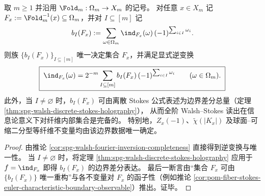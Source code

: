 \begin{corollary}\label{cor:pom-fiber-walsh-stokes-boundary-tomography-reconstruction}
取 \(m\ge 1\) 并沿用 \(\Fold_m:\Omega_m\to X_m\) 的记号。
对任意 \(x\in X_m\) 记 \(F_x:=\Fold_m^{-1}(x)\subseteq\Omega_m\)，并对 \(I\subseteq[m]\) 记
\[
b_I(F_x):=\sum_{\omega\in\Omega_m}\ind_{F_x}(\omega)\,(-1)^{\sum_{i\in I}\omega_i}.
\]
则族 \(\{b_I(F_x)\}_{I\subseteq[m]}\) 唯一决定集合 \(F_x\)，并满足显式逆变换
\[
\boxed{\;
\ind_{F_x}(\omega)=2^{-m}\sum_{I\subseteq[m]} b_I(F_x)\,(-1)^{\sum_{i\in I}\omega_i}\qquad(\omega\in\Omega_m).\;}
\]
此外，当 \(I\neq\varnothing\) 时，\(b_I(F_x)\) 可由离散 Stokes 公式表述为边界差分总量（定理 \ref{thm:spg-walsh-discrete-stokes-holography}），
从而全阶 Walsh--Stokes 读出在信息论意义下对纤维内部集合是完备的。
特别地，\(Z_x(-1)\)、\(\widetilde\chi(|K_x|)\) 及球面--可缩二分型等纤维不变量均由该边界数据唯一确定。
\end{corollary}
\begin{proof}
由推论 \ref{cor:spg-walsh-fourier-inversion-completeness} 直接得到逆变换与唯一性。
当 \(I\neq\varnothing\) 时，将定理 \ref{thm:spg-walsh-discrete-stokes-holography} 应用于 \(f=\ind_{F_x}\) 即得 \(b_I(F_x)\) 的边界差分表达。
最后一断言由“集合 \(F_x\) 可由 \(\{b_I(F_x)\}\) 唯一重构”与各不变量对 \(F_x\) 的函子性（例如推论 \ref{cor:pom-fiber-stokes-euler-characteristic-boundary-observable}）推出。证毕。
\end{proof}

\endinput
